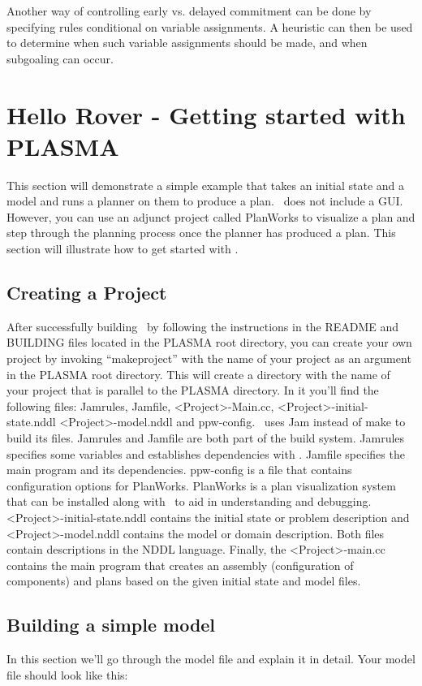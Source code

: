 \documentclass[10pt, letterpaper, twoside]{article}
\begin{document}
Another way of controlling early vs. delayed commitment can be done by
specifying rules conditional on variable assignments.  A heuristic can then
be used to determine when such variable assignments should be made, and
when subgoaling can occur.

\section{Hello Rover - Getting started with PLASMA}
\label{started}
This section will demonstrate a simple example that takes an initial state
and a model and runs a planner on them to produce a plan.  \ET\, does not
include a GUI.  However, you can use an adjunct project called PlanWorks to
visualize a plan and step through the planning process once the planner has
produced a plan.  This section will illustrate how to get started with \ET.

\subsection{Creating a Project}
\label{project}
After successfully building \ET\, by following the instructions in the
README and BUILDING files located in the PLASMA root directory, you can
create your own project by invoking ``makeproject'' with the name of your
project as an argument in the PLASMA root directory.  This will create a
directory with the name of your project that is parallel to the PLASMA
directory.  In it you'll find the following files: Jamrules, Jamfile,
<Project>-Main.cc, <Project>-initial-state.nddl <Project>-model.nddl and
ppw-config.  \ET\, uses Jam instead of make to build its files.  Jamrules
and Jamfile are both part of the build system.  Jamrules specifies some
variables and establishes dependencies with \ET.  Jamfile specifies the
main program and its dependencies.  ppw-config is a file that contains
configuration options for PlanWorks.  PlanWorks is a plan visualization
system that can be installed along with \ET\, to aid in understanding and
debugging.  <Project>-initial-state.nddl contains the initial state or
problem description and <Project>-model.nddl contains the model or domain
description. Both files contain descriptions in the NDDL language.
Finally, the <Project>-main.cc contains the main program that creates an
assembly (configuration of \ET\, components) and plans based on the given
initial state and model files.

\subsection{Building a simple model}
\label{building}
In this section we'll go through the model file and explain it in detail.
Your model file should look like this:
\end{document}
